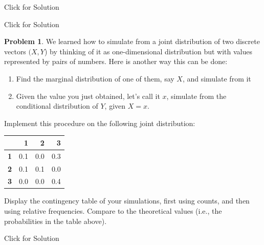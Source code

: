\documentclass[
]{book}
\theoremstyle{definition}
\theoremstyle{definition}
\theoremstyle{definition}
\newtheorem{exercise}{Problem}[chapter]
\theoremstyle{definition}
\theoremstyle{remark}
\begin{document}
Click for Solution

Click for Solution

\begin{exercise}
We learned how to simulate from a joint distribution of two discrete vectors
\((X,Y\)) by thinking of it as one-dimensional distribution but with values
represented by pairs of numbers. Here is another way this can be done:

\begin{enumerate}
\def\labelenumi{\alph{enumi}.}
\item
  Find the marginal distribution of one of them, say \(X\), and simulate from it
\item
  Given the value you just obtained, let's call it \(x\), simulate from the conditional distribution of \(Y\), given \(X=x\).
\end{enumerate}

Implement this procedure on the following joint distribution:

\begin{table}
\centering
\begin{tabular}{>{}l|r|r|r}
\hline
  & 1 & 2 & 3\\
\hline
\textbf{1} & 0.1 & 0.0 & 0.3\\
\hline
\textbf{2} & 0.1 & 0.1 & 0.0\\
\hline
\textbf{3} & 0.0 & 0.0 & 0.4\\
\hline
\end{tabular}
\end{table}

Display the contingency table of your simulations, first using counts, and then
using relative frequencies. Compare to the theoretical values (i.e., the
probabilities in the table above).
\end{exercise}

Click for Solution
\end{document}

